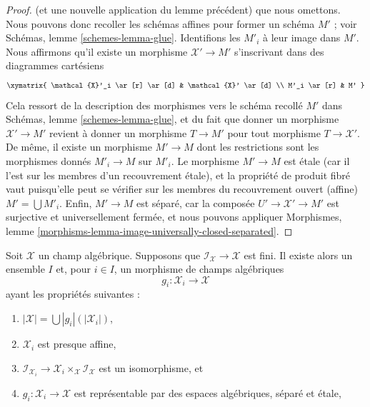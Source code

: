 \begin{proof}
(et une nouvelle application du lemme précédent) que nous omettons.
Nous pouvons donc recoller les schémas affines pour former un schéma $M'$ ; voir
Schémas, lemme \ref{schemes-lemma-glue}.
Identifions les $M'_i$ à leur image dans $M'$.
Nous affirmons qu'il existe un morphisme $\mathcal{X}' \to M'$ s'inscrivant dans des
diagrammes cartésiens
$$
\xymatrix{
\mathcal{X}'_i \ar[r] \ar[d] & \mathcal{X}' \ar[d] \\
M'_i \ar[r] & M'
}
$$
Cela ressort de la description des morphismes vers le schéma recollé $M'$
dans Schémas, lemme \ref{schemes-lemma-glue}, et du fait que donner un morphisme
$\mathcal{X}' \to M'$ revient à donner un morphisme $T \to M'$
pour tout morphisme $T \to \mathcal{X}'$.
De même, il existe un morphisme $M' \to M$ dont les restrictions sont les
morphismes donnés $M'_i \to M$ sur $M'_i$.
Le morphisme $M' \to M$ est \'etale (car il l'est sur les membres d'un
recouvrement \'etale), et la propriété de produit fibré vaut puisqu'elle peut
se vérifier sur les membres du recouvrement ouvert (affine) $M' = \bigcup M'_i$.
Enfin, $M' \to M$ est séparé, car la composée
$U' \to \mathcal{X}' \to M'$ est surjective et universellement fermée,
et nous pouvons appliquer Morphismes, lemme
\ref{morphisms-lemma-image-universally-closed-separated}.
\end{proof}

\begin{lemma}
\label{lemma-etale-local-finite-inertia}
Soit $\mathcal{X}$ un champ algébrique. Supposons que
$\mathcal{I}_\mathcal{X} \to \mathcal{X}$ est fini.
Il existe alors un ensemble $I$ et, pour $i \in I$, un morphisme de champs algébriques
$$
g_i : \mathcal{X}_i \longrightarrow \mathcal{X}
$$
ayant les propriétés suivantes :
\begin{enumerate}
\item $|\mathcal{X}| = \bigcup |g_i|(|\mathcal{X}_i|)$,
\item $\mathcal{X}_i$ est presque affine,
\item $\mathcal{I}_{\mathcal{X}_i} \to
\mathcal{X}_i \times_\mathcal{X} \mathcal{I}_\mathcal{X}$
est un isomorphisme, et
\item $g_i : \mathcal{X}_i \to \mathcal{X}$ est représentable
par des espaces algébriques, séparé et \'etale,
\end{enumerate}
\end{lemma}


